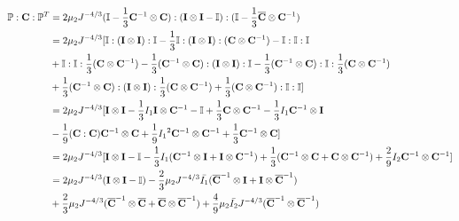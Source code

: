 \begin{equation} \label{part1}
\begin{split}
\mathbb{P} : {\bold{C}} : {\mathbb{P}}^T &= 2\mu_2{J^{-4/3}} (\mathbb{I} - \frac{1}{3}{\bold{C}}^{-1} \otimes {\bold{C}})
: (\bold{I} \otimes \bold{I} - \mathbb{I}) : (\mathbb{I} - \frac{1}{3}\overline{\bold{C}} \otimes {\bold{C}}^{-1}) \\
&= 2\mu_2{J^{-4/3}}[\mathbb{I} : (\bold{I} \otimes \bold{I}) : \mathbb{I} - \frac{1}{3}\mathbb{I} : (\bold{I} \otimes \bold{I}) : ({{\bold{C}}} \otimes {{\bold{C}}}^{-1}) - \mathbb{I} : \mathbb{I} : \mathbb{I} \\
&+ \mathbb{I} : \mathbb{I} : \frac{1}{3}({\bold{C}} \otimes {{\bold{C}}}^{-1}) - 
\frac{1}{3}({{\bold{C}}}^{-1} \otimes {\bold{C}} ) : (\bold{I} \otimes \bold{I}) : \mathbb{I}
- \frac{1}{3}({{\bold{C}}}^{-1} \otimes {\bold{C}} ) :  \mathbb{I} : \frac{1}{3}({{\bold{C}}} \otimes {{\bold{C}} }^{-1}) \\
&+ \frac{1}{3}({{\bold{C}}}^{-1} \otimes {\bold{C}} ) : (\bold{I} \otimes \bold{I}) : \frac{1}{3}({{\bold{C}}} \otimes {{\bold{C}}}^{-1} ) + \frac{1}{3}({{\bold{C}}} \otimes {{\bold{C}}}^{-1}) : \mathbb{I} : \mathbb{I}
] \\
&= 2\mu_2{J^{-4/3}}[\bold{I} \otimes \bold{I} - \frac{1}{3}{I_1}\bold{I} \otimes {{\bold{C}}}^{-1} - \mathbb{I} + \frac{1}{3}{\bold{C}} \otimes {{\bold{C}}}^{-1} -  \frac{1}{3}{I_1}{{\bold{C}}}^{-1} \otimes \bold{I} \\
&- \frac{1}{9}({\bold{C}} : {\bold{C}}){{\bold{C}}}^{-1} \otimes {{\bold{C}}} + \frac{1}{9}{{I_1}}^2{{\bold{C}}}^{-1} \otimes {{\bold{C}}}^{-1} +  \frac{1}{3}{{\bold{C}}}^{-1} \otimes {{\bold{C}}}] \\
&= 2\mu_2{J}^{-4/3}[\bold{I} \otimes \bold{I} - \mathbb{I} - \frac{1}{3}{I_1}({{\bold{C}}}^{-1} \otimes \bold{I} + \bold{I}\otimes{{\bold{C}}}^{-1} ) +
\frac{1}{3}({{\bold{C}}}^{-1} \otimes {\bold{C}} + {\bold{C}}\otimes{{\bold{C}}}^{-1} )  + \frac{2}{9}{I_2} {{\bold{C}}}^{-1} \otimes {{\bold{C}}}^{-1}] \\
&= 2\mu_2{J}^{-4/3}(\bold{I} \otimes \bold{I} - \mathbb{I}) - \frac{2}{3}\mu_2J^{-4/3}\bar{I_1}({\overline{\bold{C}}}^{-1} \otimes \bold{I} + \bold{I} \otimes {\overline{\bold{C}}}^{-1}) \\
&+
\frac{2}{3}\mu_2J^{-4/3}({\overline{\bold{C}}}^{-1} \otimes {\overline{\bold{C}}} + {\overline{\bold{C}}} \otimes {\overline{\bold{C}}}^{-1}) + \frac{4}{9}\mu_2\bar{I_2}J^{-4/3}({\overline{\bold{C}}}^{-1} \otimes {\overline{\bold{C}}}^{-1})
\end{split}
\end{equation}
